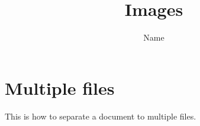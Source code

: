 \documentclass{article}
\title{Images}
\author{Name}
\date{}
\begin{document}
\maketitle
\section{Multiple files}

This is how to separate a document to multiple files.




\end{document}
